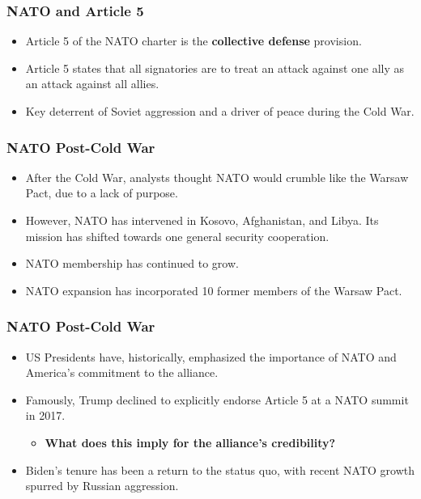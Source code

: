 \documentclass{beamer}
\begin{document}
\begin{frame} 
\frametitle{\LARGE{NATO and Article 5}}
	\begin{itemize}
		\item Article 5 of the NATO charter is the \textbf{collective defense} provision. \pause
		\item Article 5 states that all signatories are to treat an attack against one ally as an attack against all allies. \pause 
		\item Key deterrent of Soviet aggression and a driver of peace during the Cold War.
	\end{itemize}
\end{frame}

\begin{frame} 
\frametitle{\LARGE{NATO Post-Cold War}}
	\begin{itemize}
		\item After the Cold War, analysts thought NATO would crumble like the Warsaw Pact, due to a lack of purpose. \pause 
		\item However, NATO has intervened in Kosovo, Afghanistan, and Libya. Its mission has shifted towards one general security cooperation. \pause
		\item NATO membership has continued to grow. \pause
		\item NATO expansion has incorporated 10 former members of the Warsaw Pact. \pause
	\end{itemize}
\end{frame}

\begin{frame} 
	\frametitle{\LARGE{NATO Post-Cold War}}
	\begin{itemize}
		\item US Presidents have, historically, emphasized the importance of NATO and America's commitment to the alliance. \pause
		\item Famously, Trump declined to explicitly endorse Article 5 at a NATO summit in 2017. \pause
		\begin{itemize}
			\item \textbf{What does this imply for the alliance's credibility?} \pause
		\end{itemize}
		\item Biden's tenure has been a return to the status quo, with recent NATO growth spurred by Russian aggression.
	\end{itemize}
\end{frame}
	
\end{document}
